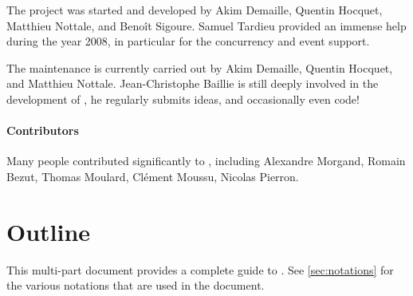 The  project was started and developed by Akim Demaille, Quentin
Hocquet, Matthieu Nottale, and Benoît Sigoure.  Samuel Tardieu provided an
immense help during the year 2008, in particular for the concurrency and
event support.

The maintenance is currently carried out by Akim Demaille, Quentin Hocquet,
and Matthieu Nottale.  Jean-Christophe Baillie is still deeply involved in
the development of \us, he regularly submits ideas, and occasionally even
code!

\paragraph{Contributors}

Many people contributed significantly to \urbi, including Alexandre Morgand,
Romain Bezut, Thomas Moulard, Clément Moussu, Nicolas Pierron.

\section{Outline}

This multi-part document provides a complete guide to \urbi.  See
\autoref{sec:notations} for the various notations that are used in the
document.

\newenvironment{partDescription}[2]
{%
  \item[\autoref{#1} --- \nameref{#1}]~\\%
  #2
  \begin{description}%
    \let\itemOrig\item%
    \renewcommand{\item}[1][]{\itemOrig[~~\autoref{##1} --- \nameref{##1}]~\\}%
  }{%
  \end{description}%
}

\begin{description}





\end{description}


\renewenvironment{partDescription}[2]
{%
  \chapter*{About This Part}
  #2
  \begin{description}%
    \let\itemOrig\item%
    \renewcommand{\item}[1][]{\itemOrig[~~\autoref{##1} --- \nameref{##1}]~\\}%
  }{%
  \end{description}%
}

